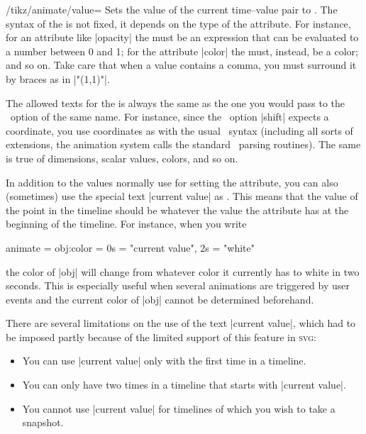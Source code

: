 \begin{key}{/tikz/animate/value=}
  Sets the value of the current time--value pair to . The
  syntax of the  is not fixed, it depends on the type of
  the attribute. For instance, for an attribute like |opacity| the
   must be an expression that can be evaluated to a number
  between 0 and 1; for the attribute |color| the  must,
  instead, be a color; and so on.  Take care that when a value
  contains a comma, you must surround it by braces as in |"{(1,1)}"|.  

  The allowed texts for the  is always the same as the
  one you would pass to the \tikzname\ option of the same 
  name. For instance, since the \tikzname\ option |shift| expects a
  coordinate, you use coordinates as  with the usual
  \tikzname\ syntax (including all sorts of extensions, the animation
  system calls the standard \tikzname\ parsing routines). The same is
  true of dimensions, scalar values, colors, and so on.

  In addition to the values normally use for setting the attribute,
  you can also (sometimes) use the special text |current value| as
  . This means that the value of the point in the timeline
  should be whatever the value the attribute has at the beginning of
  the timeline. For instance, when you write
\begin{codeexample}[]
animate = { obj:color = { 0s = "current value", 2s = "white" } }     
\end{codeexample}
  the color of |obj| will change from whatever color it currently has
  to white in two seconds. This is especially useful when several
  animations are triggered by user events and the current color of
  |obj| cannot be determined beforehand.

  There are several limitations on the use of the text
  |current value|, which had to be imposed partly because of the limited
  support of this feature in \textsc{svg}:
  \begin{itemize}
  \item You can use |current value| only with the first time in a
    timeline.
  \item You can only have two times in a timeline that starts with
    |current value|.
  \item You cannot use |current value| for timelines of which you wish
    to take a snapshot.
  \end{itemize}
\end{key}



